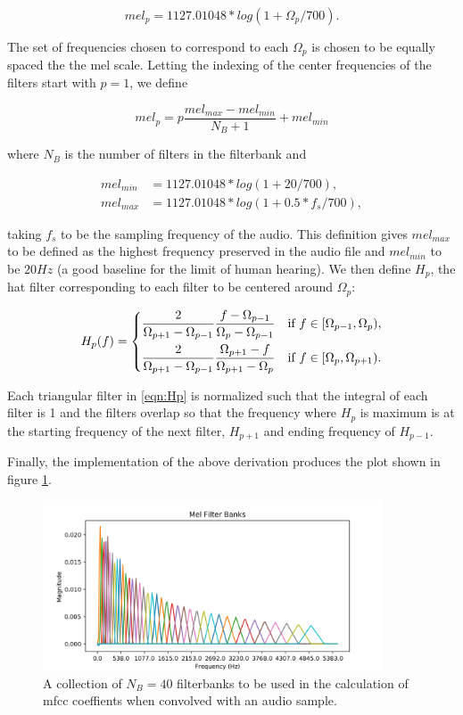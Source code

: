 \documentclass[11pt,a4paper]{article}
\begin{document}
\begin{equation}
mel_p = 1127.01048*log(1+\Omega_p/700).
\end{equation}

The set of frequencies chosen to correspond to each $\Omega_p$ is chosen to be equally spaced the the mel scale. Letting the indexing of the center frequencies of the filters start with $p=1$, we define

\begin{equation}
mel_p = p\frac{mel_{max}-mel_{min}}{N_B+1}+mel_{min}
\end{equation}

where $N_B$ is the number of filters in the filterbank and

\begin{align*}
mel_{min} &= 1127.01048*log(1+20/700), \\
mel_{max} &= 1127.01048*log(1+0.5*f_s/700),
\end{align*}

taking $f_s$ to be the sampling frequency of the audio. This definition gives $mel_{max}$ to be defined as the highest frequency preserved in the audio file and $mel_{min}$ to be $20Hz$ (a good baseline for the limit of human hearing).
We then define $H_p$, the hat filter corresponding to each filter to be centered around $\Omega_p$:

\begin{equation} \label{eqn:Hp}
H_p(f) = %
	\begin{dcases}
		\frac{2}{\Omega_{p+1}-\Omega_{p-1}}\frac{f-\Omega_{p-1}}{\Omega_p-\Omega_{p-1}} &\text{if $f \in [\Omega_{p-1},\Omega_p)$,} \\
		\frac{2}{\Omega_{p+1}-\Omega_{p-1}}\frac{\Omega_{p+1}-f}{\Omega_{p+1}-\Omega_{p}} &\text{if $f \in [\Omega_{p},\Omega_{p+1})$.}
	\end{dcases}
\end{equation}

Each triangular filter in \ref{eqn:Hp} is normalized such that the integral of each filter is 1 and the filters overlap so that the frequency where $H_p$ is maximum is at the starting frequency of the next filter, $H_{p+1}$ and ending frequency of $H_{p-1}$.

Finally, the implementation of the above derivation produces the plot shown in figure \ref{fig:mel}.

\begin{figure}
	\centering
	\includegraphics[width=0.9\textwidth]{melBanks}
	\caption{A collection of $N_B=40$ filterbanks to be used in the calculation of mfcc coeffients when convolved with an audio sample.}
	\label{fig:mel}
\end{figure}
\end{document}
